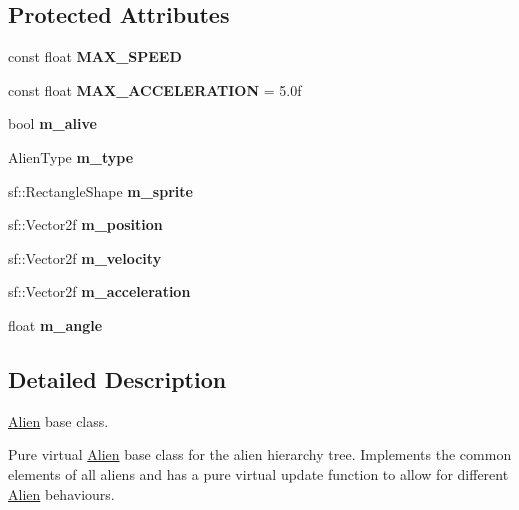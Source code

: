 \subsection*{Protected Attributes}
\begin{DoxyCompactItemize}
\item 
\mbox{\label{class_alien_a71049b4775c3bc36f77e9efae7776435}} 
const float {\bfseries M\+A\+X\+\_\+\+S\+P\+E\+ED}
\item 
\mbox{\label{class_alien_a29f82bd442a48ab652c866e7439e84df}} 
const float {\bfseries M\+A\+X\+\_\+\+A\+C\+C\+E\+L\+E\+R\+A\+T\+I\+ON} = 5.\+0f
\item 
\mbox{\label{class_alien_a76fc2c3fa215b53ad5aa4b17a763ca3b}} 
bool {\bfseries m\+\_\+alive}
\item 
\mbox{\label{class_alien_a397e6541d43dde1cdd078aa9d05db811}} 
Alien\+Type {\bfseries m\+\_\+type}
\item 
\mbox{\label{class_alien_a8198b0fd2c426e9cc463b61f27951bba}} 
sf\+::\+Rectangle\+Shape {\bfseries m\+\_\+sprite}
\item 
\mbox{\label{class_alien_a322549c43dbbb6bd8ea9200ef3f33cee}} 
sf\+::\+Vector2f {\bfseries m\+\_\+position}
\item 
\mbox{\label{class_alien_a7f7f748380d988932e34f5914492c687}} 
sf\+::\+Vector2f {\bfseries m\+\_\+velocity}
\item 
\mbox{\label{class_alien_a5eb7b53f9c2d69e3d35fa598f3c083c4}} 
sf\+::\+Vector2f {\bfseries m\+\_\+acceleration}
\item 
\mbox{\label{class_alien_a46a331850ed1b106efc2541e759ec2bd}} 
float {\bfseries m\+\_\+angle}
\end{DoxyCompactItemize}


\subsection{Detailed Description}
\hyperlink{class_alien}{Alien} base class. 

Pure virtual \hyperlink{class_alien}{Alien} base class for the alien hierarchy tree. Implements the common elements of all aliens and has a pure virtual update function to allow for different \hyperlink{class_alien}{Alien} behaviours. 

